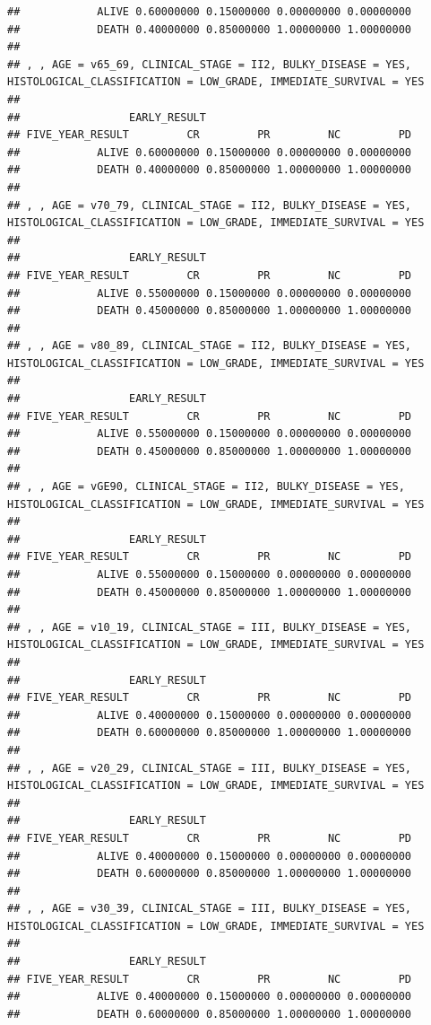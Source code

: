 \documentclass[]{article}
\begin{document}
\begin{verbatim}
##            ALIVE 0.60000000 0.15000000 0.00000000 0.00000000
##            DEATH 0.40000000 0.85000000 1.00000000 1.00000000
## 
## , , AGE = v65_69, CLINICAL_STAGE = II2, BULKY_DISEASE = YES, HISTOLOGICAL_CLASSIFICATION = LOW_GRADE, IMMEDIATE_SURVIVAL = YES
## 
##                 EARLY_RESULT
## FIVE_YEAR_RESULT         CR         PR         NC         PD
##            ALIVE 0.60000000 0.15000000 0.00000000 0.00000000
##            DEATH 0.40000000 0.85000000 1.00000000 1.00000000
## 
## , , AGE = v70_79, CLINICAL_STAGE = II2, BULKY_DISEASE = YES, HISTOLOGICAL_CLASSIFICATION = LOW_GRADE, IMMEDIATE_SURVIVAL = YES
## 
##                 EARLY_RESULT
## FIVE_YEAR_RESULT         CR         PR         NC         PD
##            ALIVE 0.55000000 0.15000000 0.00000000 0.00000000
##            DEATH 0.45000000 0.85000000 1.00000000 1.00000000
## 
## , , AGE = v80_89, CLINICAL_STAGE = II2, BULKY_DISEASE = YES, HISTOLOGICAL_CLASSIFICATION = LOW_GRADE, IMMEDIATE_SURVIVAL = YES
## 
##                 EARLY_RESULT
## FIVE_YEAR_RESULT         CR         PR         NC         PD
##            ALIVE 0.55000000 0.15000000 0.00000000 0.00000000
##            DEATH 0.45000000 0.85000000 1.00000000 1.00000000
## 
## , , AGE = vGE90, CLINICAL_STAGE = II2, BULKY_DISEASE = YES, HISTOLOGICAL_CLASSIFICATION = LOW_GRADE, IMMEDIATE_SURVIVAL = YES
## 
##                 EARLY_RESULT
## FIVE_YEAR_RESULT         CR         PR         NC         PD
##            ALIVE 0.55000000 0.15000000 0.00000000 0.00000000
##            DEATH 0.45000000 0.85000000 1.00000000 1.00000000
## 
## , , AGE = v10_19, CLINICAL_STAGE = III, BULKY_DISEASE = YES, HISTOLOGICAL_CLASSIFICATION = LOW_GRADE, IMMEDIATE_SURVIVAL = YES
## 
##                 EARLY_RESULT
## FIVE_YEAR_RESULT         CR         PR         NC         PD
##            ALIVE 0.40000000 0.15000000 0.00000000 0.00000000
##            DEATH 0.60000000 0.85000000 1.00000000 1.00000000
## 
## , , AGE = v20_29, CLINICAL_STAGE = III, BULKY_DISEASE = YES, HISTOLOGICAL_CLASSIFICATION = LOW_GRADE, IMMEDIATE_SURVIVAL = YES
## 
##                 EARLY_RESULT
## FIVE_YEAR_RESULT         CR         PR         NC         PD
##            ALIVE 0.40000000 0.15000000 0.00000000 0.00000000
##            DEATH 0.60000000 0.85000000 1.00000000 1.00000000
## 
## , , AGE = v30_39, CLINICAL_STAGE = III, BULKY_DISEASE = YES, HISTOLOGICAL_CLASSIFICATION = LOW_GRADE, IMMEDIATE_SURVIVAL = YES
## 
##                 EARLY_RESULT
## FIVE_YEAR_RESULT         CR         PR         NC         PD
##            ALIVE 0.40000000 0.15000000 0.00000000 0.00000000
##            DEATH 0.60000000 0.85000000 1.00000000 1.00000000

\end{verbatim}
\end{document}
